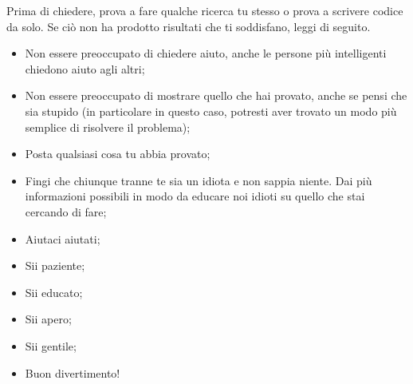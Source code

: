 Prima di chiedere, prova a fare qualche ricerca tu stesso o prova a scrivere codice da solo. Se ciò non ha prodotto risultati che ti soddisfano, leggi di seguito.

\begin{itemize}
	\item Non essere preoccupato di chiedere aiuto, anche le persone più intelligenti chiedono aiuto agli altri;
	\item Non essere preoccupato di mostrare quello che hai provato, anche se pensi che sia stupido (in particolare in questo caso, potresti aver trovato un modo più semplice di risolvere il problema);
	\item Posta qualsiasi cosa tu abbia provato;
	\item Fingi che chiunque tranne te sia un idiota e non sappia niente. Dai più informazioni possibili in modo da educare noi idioti su quello che stai cercando di fare;
	\item Aiutaci aiutati;
	\item Sii paziente;
	\item Sii educato;
	\item Sii apero;
	\item Sii gentile;
	\item Buon divertimento!
\end{itemize}
